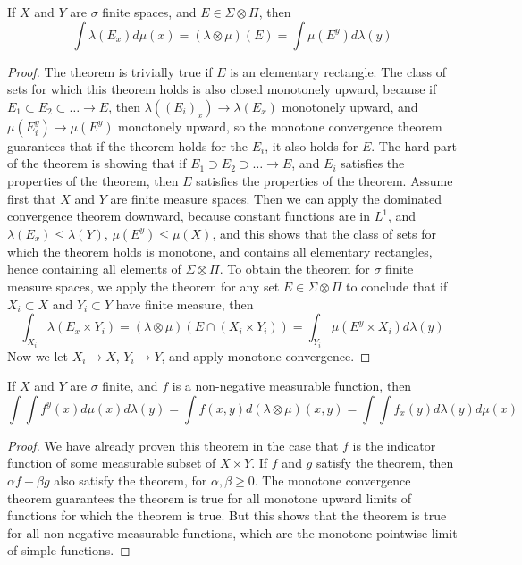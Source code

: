 \begin{theorem}
    If $X$ and $Y$ are $\sigma$ finite spaces, and $E \in \Sigma \otimes \Pi$, then
    \[ \int \lambda(E_x) d\mu(x) = (\lambda \otimes \mu)(E) = \int \mu(E^y) d\lambda(y) \]
\end{theorem}
\begin{proof}
    The theorem is trivially true if $E$ is an elementary rectangle. The class of sets for which this theorem holds is also closed monotonely upward, because if $E_1 \subset E_2 \subset \dots \to E$, then $\lambda((E_i)_x) \to \lambda(E_x)$ monotonely upward, and $\mu(E_i^y) \to \mu(E^y)$ monotonely upward, so the monotone convergence theorem guarantees that if the theorem holds for the $E_i$, it also holds for $E$. The hard part of the theorem is showing that if $E_1 \supset E_2 \supset \dots \to E$, and $E_i$ satisfies the properties of the theorem, then $E$ satisfies the properties of the theorem. Assume first that $X$ and $Y$ are finite measure spaces. Then we can apply the dominated convergence theorem downward, because constant functions are in $L^1$, and $\lambda(E_x) \leq \lambda(Y)$, $\mu(E^y) \leq \mu(X)$, and this shows that the class of sets for which the theorem holds is monotone, and contains all elementary rectangles, hence containing all elements of $\Sigma \otimes \Pi$. To obtain the theorem for $\sigma$ finite measure spaces, we apply the theorem for any set $E \in \Sigma \otimes \Pi$ to conclude that if $X_i \subset X$ and $Y_i \subset Y$ have finite measure, then
    \[ \int_{X_i} \lambda(E_x \times Y_i) = (\lambda \otimes \mu)(E \cap (X_i \times Y_i)) = \int_{Y_i} \mu(E^y \times X_i) d\lambda(y) \]
    Now we let $X_i \to X$, $Y_i \to Y$, and apply monotone convergence.
\end{proof}

\begin{theorem}[Tonelli]
    If $X$ and $Y$ are $\sigma$ finite, and $f$ is a non-negative measurable function, then
    \[ \int \int f^y(x) d\mu(x) d\lambda(y) = \int f(x,y) d(\lambda \otimes \mu)(x,y) = \int \int f_x(y) d\lambda(y) d\mu(x) \]
\end{theorem}
\begin{proof}
    We have already proven this theorem in the case that $f$ is the indicator function of some measurable subset of $X \times Y$. If $f$ and $g$ satisfy the theorem, then $\alpha f + \beta g$ also satisfy the theorem, for $\alpha, \beta \geq 0$. The monotone convergence theorem guarantees the theorem is true for all monotone upward limits of functions for which the theorem is true. But this shows that the theorem is true for all non-negative measurable functions, which are the monotone pointwise limit of simple functions.
\end{proof}

